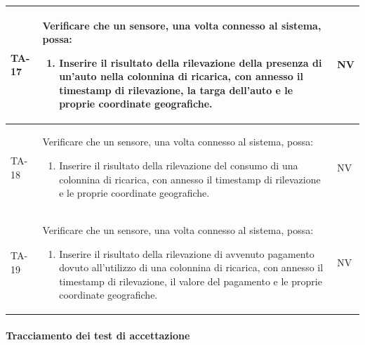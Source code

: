 \documentclass[8pt]{article}
\newcommand{\subsubsubsection}[1]{\paragraph{#1}\mbox{}\\\\}
\begin{document}
\begin{longtable}{|>{\centering}p{2cm}|>{\RaggedRight}m{12cm}|>{\centering\arraybackslash}p{2cm}|}
    \hline
    TA-17 &
    Verificare che un sensore, una volta connesso al sistema, possa:
    \begin{enumerate}
    \item Inserire il risultato della rilevazione della presenza di un'auto nella colonnina di ricarica, con annesso il timestamp di rilevazione, la targa dell'auto e le proprie coordinate geografiche.  
    \end{enumerate}
    & NV \\
    \hline
    TA-18 &
    Verificare che un sensore, una volta connesso al sistema, possa:
    \begin{enumerate}
    \item Inserire il risultato della rilevazione del consumo di una colonnina di ricarica, con annesso il timestamp di rilevazione e le proprie coordinate geografiche.  
    \end{enumerate}
    & NV \\
    \hline
    TA-19 &
    Verificare che un sensore, una volta connesso al sistema, possa:
    \begin{enumerate}
    \item Inserire il risultato della rilevazione di avvenuto pagamento dovuto all'utilizzo di una colonnina di ricarica, con annesso il timestamp di rilevazione, il valore del pagamento e le proprie coordinate geografiche. 
    \end{enumerate}
    & NV \\
    \hline
\end{longtable}
\subsubsubsection{Tracciamento dei test di accettazione}
\renewcommand{\arraystretch}{2.5}
\end{document}

